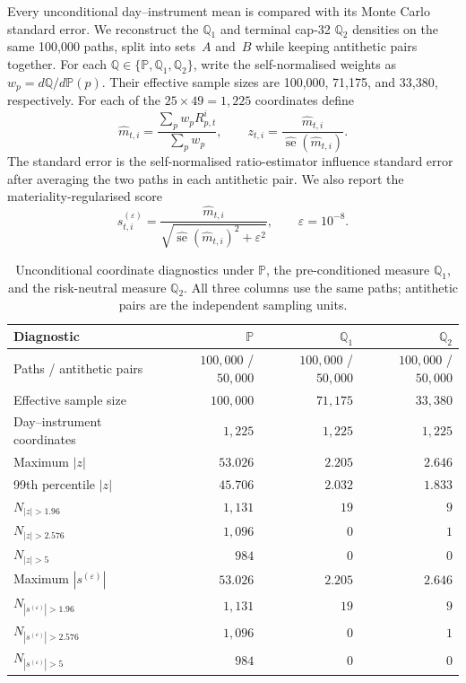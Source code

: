\documentclass[11pt,a4paper]{article}
\newcommand{\Q}{\mathbb{Q}}
\renewcommand{\P}{\mathbb{P}}
\renewcommand{\Q}{\mathbb{Q}}
\begin{document}
Every unconditional day--instrument mean is compared with its Monte Carlo
standard error.  We reconstruct the $\Q_1$ and terminal cap-32 $\Q_2$
densities on the same 100,000 paths, split into sets~$A$ and~$B$ while keeping
antithetic pairs together. 
For each $\Q\in\{\P,\Q_1,\Q_2\}$, write the self-normalised weights as
$w_p=d\Q/d\P(p)$.  Their effective sample sizes are 100,000, 71,175, and
33,380, respectively.  For each of the $25\times49=1{,}225$ coordinates define
\begin{equation}
  \widehat m_{t,i}
  =\frac{\sum_p w_pR_{p,t}^i}{\sum_p w_p},
  \qquad
  z_{t,i}
  =\frac{\widehat m_{t,i}}
  {\widehat{\operatorname{se}}(\widehat m_{t,i})}.
  \label{eq:rn-unconditional-z}
\end{equation}
The standard error is the self-normalised ratio-estimator influence standard
error after averaging the two paths in each antithetic pair.  We also report
the materiality-regularised score
\begin{equation}
  s_{t,i}^{(\varepsilon)}
  =\frac{\widehat m_{t,i}}
  {\sqrt{\widehat{\operatorname{se}}(\widehat m_{t,i})^2+\varepsilon^2}},
  \qquad \varepsilon=10^{-8}.
  \label{eq:rn-materiality-score}
\end{equation}

\begin{table}[H]
  \centering
  \small
  \begin{tabular}{@{}lrrr@{}}
    \toprule
    Diagnostic & $\P$  & $\Q_1$  & $\Q_2$  \\
    \midrule
    Paths / antithetic pairs
      & $100{,}000$ / $50{,}000$ & $100{,}000$ / $50{,}000$
      & $100{,}000$ / $50{,}000$ \\
    Effective sample size & $100{,}000$ & $71{,}175$ & $33{,}380$ \\
    Day--instrument coordinates & $1{,}225$ & $1{,}225$ & $1{,}225$ \\
    Maximum $|z|$ & $53.026$ & $2.205$ & $2.646$ \\
    99th percentile $|z|$ & $45.706$ & $2.032$ & $1.833$ \\
    $N_{|z|>1.96}$ & $1{,}131$ & $19$ & $9$ \\
    $N_{|z|>2.576}$ & $1{,}096$ & $0$ & $1$ \\
    $N_{|z|>5}$ & $984$ & $0$ & $0$ \\
    Maximum $|s^{(\varepsilon)}|$ & $53.026$ & $2.205$ & $2.646$ \\
    $N_{|s^{(\varepsilon)}|>1.96}$ & $1{,}131$ & $19$ & $9$ \\
    $N_{|s^{(\varepsilon)}|>2.576}$ & $1{,}096$ & $0$ & $1$ \\
    $N_{|s^{(\varepsilon)}|>5}$ & $984$ & $0$ & $0$ \\
    \bottomrule
  \end{tabular}
  \caption{Unconditional coordinate diagnostics under $\P$, the
  pre-conditioned measure $\Q_1$, and the risk-neutral measure $\Q_2$.
  All three columns use the same paths; antithetic pairs are the independent
  sampling units.}
  \label{tab:rn-q2-unconditional}
\end{table}
\end{document}
